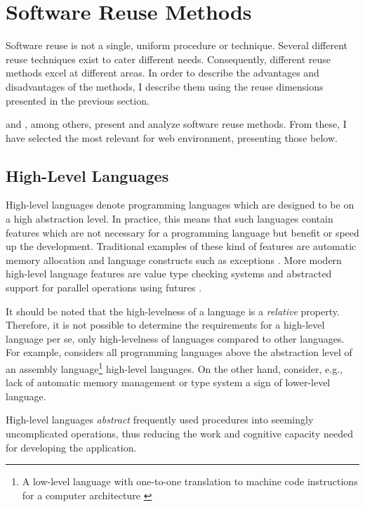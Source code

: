\section{Software Reuse Methods}

Software reuse is not a single, uniform procedure or technique. Several different reuse techniques exist to cater different needs. Consequently, different reuse methods excel at different areas. In order to describe the advantages and disadvantages of the methods, I describe them using the reuse dimensions presented in the previous section.

\citet{krueger_software_1992} and \citet{sametinger_software_1997}, among others, present and analyze software reuse methods. From these, I have selected the most relevant for web environment, presenting those below.

\subsection{High-Level Languages}
High-level languages denote programming languages which are designed to be on a high abstraction level. In practice, this means that such languages contain features which are not necessary for a programming language but benefit or speed up the development. Traditional examples of these kind of features are automatic memory allocation \citep{krueger_software_1992} and language constructs such as exceptions \citep{mitchell_concepts_2003}. More modern high-level language features are value type checking systems and abstracted support for parallel operations using futures \citep{totoo_haskell_2012}. 

It should be noted that the high-levelness of a language is a \emph{relative} property. Therefore, it is not possible to determine the requirements for a high-level language per se, only high-levelness of languages compared to other languages. For example, \citet{krueger_software_1992} considers all programming languages above the abstraction level of an assembly language\footnote{A low-level language with one-to-one translation to machine code instructions for a computer architecture \citep{salomon_assemblers_1993}} high-level languages. On the other hand, \citet{carro_high-level_2006} consider, e.g., lack of automatic memory management or type system a sign of lower-level language.

High-level languages \emph{abstract} frequently used procedures into seemingly uncomplicated operations, thus reducing the work and cognitive capacity needed for developing the application. \citep[chap.~3]{krueger_software_1992}

